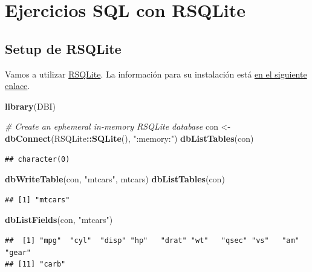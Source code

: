 \documentclass[]{book}
\newenvironment{Shaded}{\begin{snugshade}}{\end{snugshade}}
\newcommand{\CommentTok}[1]{\textcolor[rgb]{0.56,0.35,0.01}{\textit{#1}}}
\newcommand{\KeywordTok}[1]{\textcolor[rgb]{0.13,0.29,0.53}{\textbf{#1}}}
\newcommand{\NormalTok}[1]{#1}
\newcommand{\OperatorTok}[1]{\textcolor[rgb]{0.81,0.36,0.00}{\textbf{#1}}}
\newcommand{\StringTok}[1]{\textcolor[rgb]{0.31,0.60,0.02}{#1}}
\begin{document}
\hypertarget{ejercicios-sql-con-rsqlite}{%
\section{Ejercicios SQL con RSQLite}\label{ejercicios-sql-con-rsqlite}}

\hypertarget{setup-de-rsqlite}{%
\subsection{Setup de RSQLite}\label{setup-de-rsqlite}}

Vamos a utilizar \href{https://cran.r-project.org/web/packages/RSQLite/index.html}{RSQLite}. La información para su instalación está \href{https://db.rstudio.com/databases/sqlite/}{en el siguiente enlace}.

\begin{Shaded}
\begin{Highlighting}[]
\KeywordTok{library}\NormalTok{(DBI)}

\CommentTok{# Create an ephemeral in-memory RSQLite database}
\NormalTok{con <-}\StringTok{ }\KeywordTok{dbConnect}\NormalTok{(RSQLite}\OperatorTok{::}\KeywordTok{SQLite}\NormalTok{(), }\StringTok{":memory:"}\NormalTok{)}
\KeywordTok{dbListTables}\NormalTok{(con)}
\end{Highlighting}
\end{Shaded}

\begin{verbatim}
## character(0)
\end{verbatim}

\begin{Shaded}
\begin{Highlighting}[]
\KeywordTok{dbWriteTable}\NormalTok{(con, }\StringTok{"mtcars"}\NormalTok{, mtcars)}
\KeywordTok{dbListTables}\NormalTok{(con)}
\end{Highlighting}
\end{Shaded}

\begin{verbatim}
## [1] "mtcars"
\end{verbatim}

\begin{Shaded}
\begin{Highlighting}[]
\KeywordTok{dbListFields}\NormalTok{(con, }\StringTok{"mtcars"}\NormalTok{)}
\end{Highlighting}
\end{Shaded}

\begin{verbatim}
##  [1] "mpg"  "cyl"  "disp" "hp"   "drat" "wt"   "qsec" "vs"   "am"   "gear"
## [11] "carb"
\end{verbatim}
\end{document}
